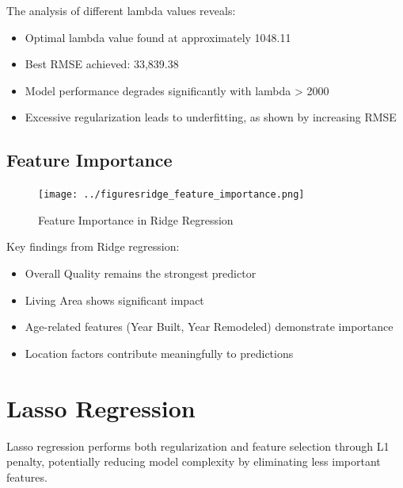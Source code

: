 The analysis of different lambda values reveals:
\begin{itemize}
    \item Optimal lambda value found at approximately 1048.11
    \item Best RMSE achieved: 33,839.38
    \item Model performance degrades significantly with lambda > 2000
    \item Excessive regularization leads to underfitting, as shown by increasing RMSE
\end{itemize}

\subsection{Feature Importance}
\begin{figure}[H]
    \centering
    \texttt{[image: ../figuresridge\_feature\_importance.png]}
    \caption{Feature Importance in Ridge Regression}
    \label{fig:ridge_importance}
\end{figure}

Key findings from Ridge regression:
\begin{itemize}
    \item Overall Quality remains the strongest predictor
    \item Living Area shows significant impact
    \item Age-related features (Year Built, Year Remodeled) demonstrate importance
    \item Location factors contribute meaningfully to predictions
\end{itemize}

\section{Lasso Regression}
Lasso regression performs both regularization and feature selection through L1 penalty, potentially reducing model complexity by eliminating less important features.

